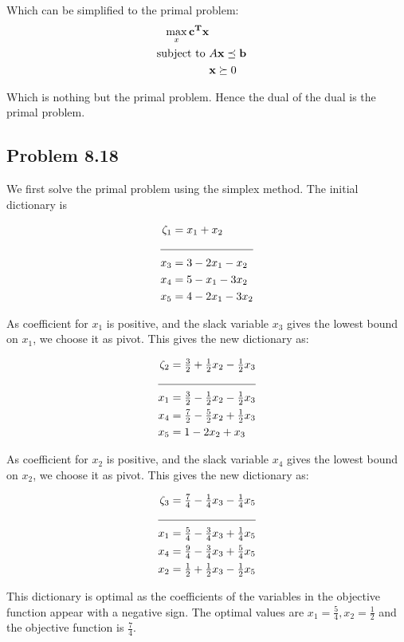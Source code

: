 \documentclass[letterpaper,12pt]{article}
\theoremstyle{definition}
\begin{document}
Which can be simplified to the primal problem:
\begin{align*}
\max_{{x}} \mathbf{c^Tx} \\
\textnormal{subject to } &A\textbf{x}\preceq \textbf{b}\\
&\textbf{x} \succeq 0\\
\end{align*}

Which is nothing but the primal problem. Hence the dual of the dual is the primal problem.

\subsection*{Problem 8.18}
We first solve the primal problem using the simplex method. The initial dictionary is

\begin{align*}
  \zeta_1 &= x_1+x_2\\
  \cline{1-2}
  x_3 &= 3-2x_1-x_2\\
  x_4 &= 5-x_1-3x_2\\
  x_5 &= 4-2x_1-3x_2\\
\end{align*}
\begin{flushleft}
As coefficient for $x_1$ is positive, and  the slack variable $x_3$ gives the lowest bound on $x_1$, we choose it as pivot. This gives the new dictionary as:
\end{flushleft}

\begin{align*}
  \zeta_2 &= \tfrac{3}{2} + \tfrac{1}{2}x_2-\tfrac{1}{2}x_3\\
  \cline{1-2}
  x_1 &= \tfrac{3}{2} -\tfrac{1}{2}x_2-\tfrac{1}{2}x_3\\
  x_4 &= \tfrac{7}{2}-\tfrac{5}{2}x_2+\tfrac{1}{2}x_3\\
  x_5 &= 1-2x_2+x_3\\
\end{align*}
\begin{flushleft}
As coefficient for $x_2$ is positive, and  the slack variable $x_4$ gives the lowest bound on $x_2$, we choose it as pivot. This gives the new dictionary as:
\end{flushleft}

\begin{align*}
  \zeta_3 &= \tfrac{7}{4} - \tfrac{1}{4}x_3-\tfrac{1}{4}x_5\\
  \cline{1-2}
  x_1 &= \tfrac{5}{4} - \tfrac{3}{4}x_3+\tfrac{1}{4}x_5\\
  x_4 &= \tfrac{9}{4} - \tfrac{3}{4}x_3+\tfrac{5}{4}x_5\\
  x_2 &=\tfrac{1}{2}+\tfrac{1}{2}x_3-\tfrac{1}{2}x_5\\
\end{align*}
\begin{flushleft}
This dictionary is optimal as the coefficients of the variables in the objective function appear with a
negative sign. The optimal values are $x_1=\frac{5}{4}, x_2 = \frac{1}{2}$ and the objective function is $\frac{7}{4}$.
\end{flushleft}
\end{document}
